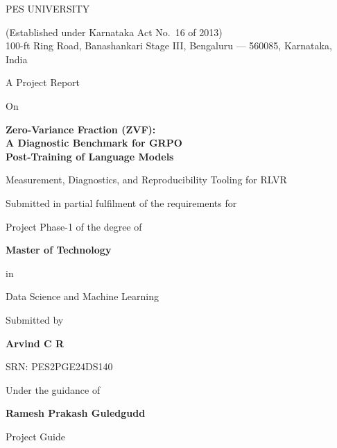 \documentclass[12pt,a4paper]{report}
\begin{document}
\hypersetup{pageanchor=false}

\begin{titlepage}
\centering
\thispagestyle{empty}
\vspace*{0.05in}

{\large PES UNIVERSITY\par}
{\footnotesize (Established under Karnataka Act No.\ 16 of 2013)\\
100-ft Ring Road, Banashankari Stage III, Bengaluru --- 560085, Karnataka, India\par}

\vspace{0.25in}
{\normalsize A Project Report\par}
{\normalsize On\par}
\vspace{0.5em}
{\Large\bfseries Zero-Variance Fraction (ZVF):\\[0.35em]
A Diagnostic Benchmark for GRPO\\[0.25em] Post-Training of Language Models\par}
\vspace{0.6em}
{\normalsize Measurement, Diagnostics, and Reproducibility Tooling for RLVR\par}

\vfill

{\large Submitted in partial fulfilment of the requirements for\par}
{\large Project Phase-1 of the degree of\par}
\vspace{0.6em}
{\large\bfseries Master of Technology\par}
\vspace{0.2em}
{\normalsize in\par}
\vspace{0.2em}
{\large Data Science and Machine Learning\par}

\vfill

{\normalsize Submitted by\par}
\vspace{0.3em}
{\large\bfseries Arvind C R\par}
{\normalsize SRN: PES2PGE24DS140\par}

\vspace{0.5em}
{\normalsize Under the guidance of\par}
\vspace{0.2em}
{\large\bfseries Ramesh Prakash Guledgudd\par}
{\normalsize Project Guide\par}


\end{titlepage}
\end{document}
